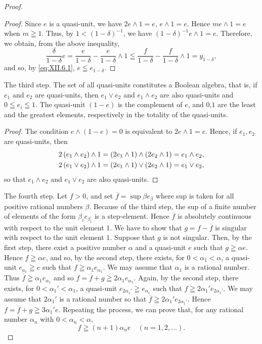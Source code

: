 \begin{proof}
\begin{proof}
Since $e$ is a quasi-unit, we have $2e \wedge 1 = e$, $e \wedge 1 = e$. Hence $me \wedge 1 = e$ when $m \geqq 1$. Thus, by $1 < (1 - \delta)^{-1}$, we have $(1 - \delta)^{-1}e \wedge 1 = e$. Therefore, we obtain, from the above inequality, 
\[
\frac {\delta}{1 - \delta} e = \frac {e}{1 - \delta} - \frac {e}{1 - \delta} \wedge 1 \leqq \frac {f}{1 - \delta} - \frac {f}{1 - \delta} \wedge 1 = y _{1- \delta},
\]
and so, by \eqref{eq:XII.6.1}, $e \leqq e_{1- \delta}$. 
\end{proof}

The third step. The set of all quasi-units constitutes a Boolean algebra, that is, if $e_{1}$ and $e_{2}$ are quasi-units, then $e_{1} \vee e_{2}$ and $e_{1} \wedge e_{2}$ are also quasi-units and $0 \leqq e_{i} \leqq 1$. The quasi-unit $(1 - e)$ is the complement of $e$, and $0$,$1$ are the least and the greatest elements, respectively in the totality of the quasi-units. 

\begin{proof}
 The condition $e \wedge (1 - e) = 0$ is equivalent to $2e \wedge 1 = e$. Hence, if $e_1, e_2$ are quasi-units, then 
\begin{align}
2 \left(e _{1} \wedge e _{2}\right) \wedge 1& = \left(2 e _{1} \wedge 1\right) \wedge \left(2 e _{2} \wedge 1\right) = e _{1} \wedge e _{2}, \notag \\
2 \left(e _{1} \vee e _{2}\right) \wedge 1& = \left(2 e _{1} \wedge 1\right) \vee \left(2 e _{2} \wedge 1\right) = e _{1} \vee e _{2}, \notag
\end{align}
so that $e_1 \wedge e_2$ and $e_1 \vee e_2$ are also quasi-units. 
\end{proof}

The fourth step. Let $f > 0$, and set $\overline{f} = \sup \beta e_{\beta}$ where sup is taken for all positive rational numbers $\beta$. Because of the third step, the sup of a finite number of elements of the form $\beta_i e_{\beta_i}$ is a step-element. Hence $\overline{f}$ is absolutely continuous with respect to the unit element $1$. We have to show that $g = f - \overline{f}$ is singular with respect to the unit element $1$. Suppose that $g$ is not singular. Then, by the first step, there exist a positive number $\alpha$ and a quasi-unit $e$ such that $g \geqq \alpha e$. Hence $f \geqq \alpha e$, and so, by the second step, there exists, for $0 < \alpha_1 < \alpha$, a quasi-unit $e_{a_1} \geqq e$ such that $f \geqq \alpha_1 e_{\alpha_1}$. We may assume that $\alpha_1$ is a rational number. Thus $\overline{f} \geqq \alpha_1 e_{\alpha_1}$ and so $f = \overline{f} + g \geqq 2\alpha_1 e_{\alpha_1}$. Again, by the second step, there exists, for $0 < \alpha_1' < \alpha_1$, a quasi-unit $e_{2\alpha_1'} \geqq e_{\alpha_1}$ such that $f \geqq 2\alpha_1' e_{2\alpha_1'}$. We may assume that $2\alpha_1'$ is a rational number so that $\overline{f} \geqq 2\alpha_1' e_{2\alpha_1'}$. Hence $f = \overline{f} + g \geqq 3\alpha_1' e$. Repeating the process, we can prove that, for any rational number $\alpha_n$ with $0 < \alpha_n < \alpha$, 
\[
f \geqq (n + 1) \alpha_{n} e \quad (n = 1, 2, \dots).
\]


\end{proof}
